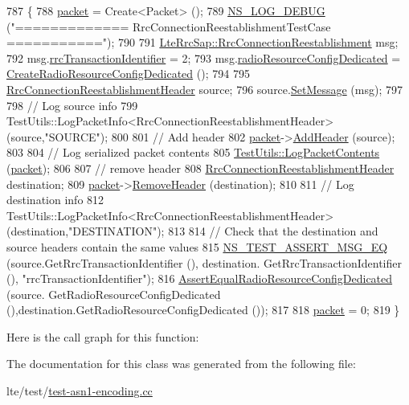 \begin{DoxyCode}
787 \{
788   \hyperlink{classRrcHeaderTestCase_a6f0748c0e845f797497fbda1ca781803}{packet} = Create<Packet> ();
789   \hyperlink{group__logging_ga413f1886406d49f59a6a0a89b77b4d0a}{NS\_LOG\_DEBUG} (\textcolor{stringliteral}{"============= RrcConnectionReestablishmentTestCase ==========="});
790 
791   \hyperlink{structns3_1_1LteRrcSap_1_1RrcConnectionReestablishment}{LteRrcSap::RrcConnectionReestablishment} msg;
792   msg.\hyperlink{structns3_1_1LteRrcSap_1_1RrcConnectionReestablishment_acd894e6f1f5a38a2a87f5968a10802cd}{rrcTransactionIdentifier} = 2;
793   msg.\hyperlink{structns3_1_1LteRrcSap_1_1RrcConnectionReestablishment_ac8c576ec1c5909704cced17ca5566b29}{radioResourceConfigDedicated} = 
      \hyperlink{classRrcHeaderTestCase_a078175e25caaedb4ef308b54e76db7b4}{CreateRadioResourceConfigDedicated} ();
794 
795   \hyperlink{classns3_1_1RrcConnectionReestablishmentHeader}{RrcConnectionReestablishmentHeader} source;
796   source.\hyperlink{classns3_1_1RrcConnectionReestablishmentHeader_ab0a4d827375abc6a26c970900c68c8ea}{SetMessage} (msg);
797 
798   \textcolor{comment}{// Log source info}
799   TestUtils::LogPacketInfo<RrcConnectionReestablishmentHeader> (source,\textcolor{stringliteral}{"SOURCE"});
800 
801   \textcolor{comment}{// Add header}
802   \hyperlink{classRrcHeaderTestCase_a6f0748c0e845f797497fbda1ca781803}{packet}->\hyperlink{classns3_1_1Packet_a465108c595a0bc592095cbcab1832ed8}{AddHeader} (source);
803 
804   \textcolor{comment}{// Log serialized packet contents}
805   \hyperlink{classTestUtils_a9391dac3282094e6e57c0052d88a086f}{TestUtils::LogPacketContents} (\hyperlink{classRrcHeaderTestCase_a6f0748c0e845f797497fbda1ca781803}{packet});
806 
807   \textcolor{comment}{// remove header}
808   \hyperlink{classns3_1_1RrcConnectionReestablishmentHeader}{RrcConnectionReestablishmentHeader} destination;
809   \hyperlink{classRrcHeaderTestCase_a6f0748c0e845f797497fbda1ca781803}{packet}->\hyperlink{classns3_1_1Packet_a0961eccf975d75f902d40956c93ba63e}{RemoveHeader} (destination);
810 
811   \textcolor{comment}{// Log destination info}
812   TestUtils::LogPacketInfo<RrcConnectionReestablishmentHeader> (destination,\textcolor{stringliteral}{"DESTINATION"});
813 
814   \textcolor{comment}{// Check that the destination and source headers contain the same values}
815   \hyperlink{group__testing_ga2a9d78cffb3db8e867c35fff0b698cf5}{NS\_TEST\_ASSERT\_MSG\_EQ} (source.GetRrcTransactionIdentifier (), destination.
      GetRrcTransactionIdentifier (), \textcolor{stringliteral}{"rrcTransactionIdentifier"});
816   \hyperlink{classRrcHeaderTestCase_ab6230c6987acd58d7482ca5e40b80875}{AssertEqualRadioResourceConfigDedicated} (source.
      GetRadioResourceConfigDedicated (),destination.GetRadioResourceConfigDedicated ());
817 
818   \hyperlink{classRrcHeaderTestCase_a6f0748c0e845f797497fbda1ca781803}{packet} = 0;
819 \}
\end{DoxyCode}


Here is the call graph for this function\+:




The documentation for this class was generated from the following file\+:\begin{DoxyCompactItemize}
\item 
lte/test/\hyperlink{test-asn1-encoding_8cc}{test-\/asn1-\/encoding.\+cc}\end{DoxyCompactItemize}
